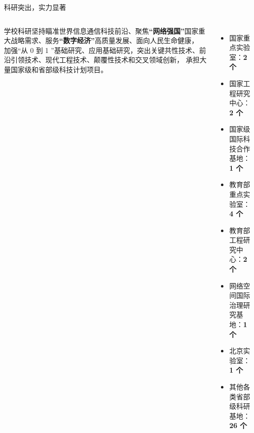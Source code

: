 \documentclass[aspectratio=169, utf8]{beamer}
\begin{document}
\begin{frame}{科研突出，实力显著}
    \begin{columns}
        \setlength{\parindent}{2em}

        学校科研坚持瞄准世界信息通信科技前沿、聚焦\textcolor{Fore}{\textbf{“网络强国”}}国家重大战略需求、服务\textcolor{Fore}{\textbf{“数字经济”}}高质量发展、面向人民生命健康，
        加强“从 0 到 1 ”基础研究、应用基础研究，突出关键共性技术、前沿引领技术、现代工程技术、颠覆性技术和交叉领域创新，
        承担大量国家级和省部级科技计划项目。

        \begin{itemize}
            \item 国家重点实验室：\textcolor{Fore}{\textbf{2 个}}
            \item 国家工程研究中心：\textcolor{Fore}{\textbf{2 个}}
            \item 国家级国际科技合作基地：\textcolor{Fore}{\textbf{1 个}}
            \item 教育部重点实验室：\textcolor{Fore}{\textbf{4 个}}
            \item 教育部工程研究中心：\textcolor{Fore}{\textbf{2 个}}
            \item 网络空间国际治理研究基地：\textcolor{Fore}{\textbf{1 个}}
            \item 北京实验室：\textcolor{Fore}{\textbf{1 个}}
            \item 其他各类省部级科研基地：\textcolor{Fore}{\textbf{26 个}}
        \end{itemize}
    \end{columns}
\end{frame}
\end{document}
